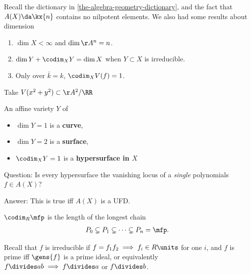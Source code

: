 Recall the dictionary in \cref{the-algebra-geometry-dictionary}, and the
fact that \(A(X) \da \kx{n}\) contains no nilpotent elements. We also
had some results about dimension

\begin{enumerate}
\def\labelenumi{\arabic{enumi}.}
\tightlist
\item
  \(\dim X<\infty\) and \(\dim \AA^n = n\).
\item
  \(\dim Y + \codim_X Y = \dim X\) when \(Y\subset X\) is irreducible.
\item
  Only over \(\bar k = k\), \(\codim_X V(f) = 1\).
\end{enumerate}

\begin{example}

Take \(V(x^2+y^2) \subset \AA^2/\RR\)

\end{example}

\begin{definition}[?]

An affine variety \(Y\) of

\begin{itemize}
\tightlist
\item
  \(\dim Y = 1\) is a \textbf{curve},
\item
  \(\dim Y = 2\) is a \textbf{surface},
\item
  \(\codim_X Y = 1\) is a \textbf{hypersurface in \(X\)}
\end{itemize}

\end{definition}

Question: Is every hypersurface the vanishing locus of a \emph{single}
polynomials \(f\in A(X)\)?

Answer: This is true iff \(A(X)\) is a UFD.

\begin{definition}

\(\codim_R \mfp\) is the length of the longest chain
\begin{align*}P_0 \subsetneq P_1 \subsetneq \cdots \subsetneq P_n = \mfp.\end{align*}

\end{definition}

Recall that \(f\) is irreducible if
\(f = f_1 f_2 \implies f_i \in R\units\) for one \(i\), and \(f\) is
prime iff \(\gens{f}\) is a prime ideal, or equivalently
\(f\divides ab \implies f\divides a\) or \(f\divides b\).

